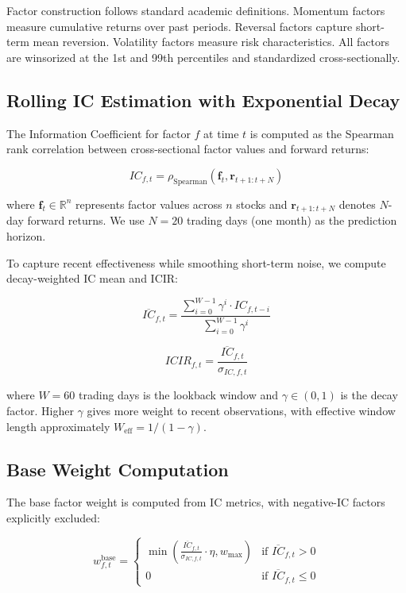 Factor construction follows standard academic definitions. Momentum factors measure cumulative returns over past periods. Reversal factors capture short-term mean reversion. Volatility factors measure risk characteristics. All factors are winsorized at the 1st and 99th percentiles and standardized cross-sectionally.

\subsection{Rolling IC Estimation with Exponential Decay}

The Information Coefficient for factor $f$ at time $t$ is computed as the Spearman rank correlation between cross-sectional factor values and forward returns:

\begin{equation}
IC_{f,t} = \rho_{\text{Spearman}}(\mathbf{f}_t, \mathbf{r}_{t+1:t+N})
\end{equation}

where $\mathbf{f}_t \in \mathbb{R}^{n}$ represents factor values across $n$ stocks and $\mathbf{r}_{t+1:t+N}$ denotes $N$-day forward returns. We use $N=20$ trading days (one month) as the prediction horizon.

To capture recent effectiveness while smoothing short-term noise, we compute decay-weighted IC mean and ICIR:

\begin{equation}
\overline{IC}_{f,t} = \frac{\sum_{i=0}^{W-1} \gamma^i \cdot IC_{f,t-i}}{\sum_{i=0}^{W-1} \gamma^i}
\end{equation}

\begin{equation}
ICIR_{f,t} = \frac{\overline{IC}_{f,t}}{\sigma_{IC,f,t}}
\end{equation}

where $W = 60$ trading days is the lookback window and $\gamma \in (0,1)$ is the decay factor. Higher $\gamma$ gives more weight to recent observations, with effective window length approximately $W_{\text{eff}} = 1/(1-\gamma)$.

\subsection{Base Weight Computation}

The base factor weight is computed from IC metrics, with negative-IC factors explicitly excluded:

\begin{equation}
w_{f,t}^{\text{base}} = \begin{cases}
\min\left(\frac{\overline{IC}_{f,t}}{\sigma_{IC,f,t}} \cdot \eta, w_{\text{max}}\right) & \text{if } \overline{IC}_{f,t} > 0 \\
0 & \text{if } \overline{IC}_{f,t} \leq 0
\end{cases}
\end{equation}

